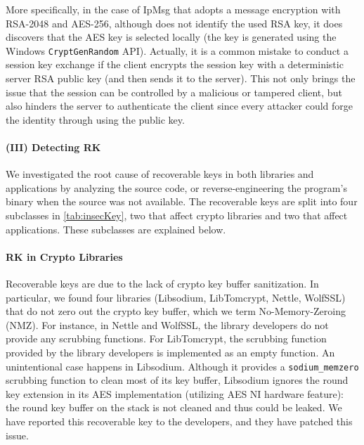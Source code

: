 {
More specifically, in the case of \textsf{\small IpMsg} that adopts a message encryption with \textsf{\small RSA-2048} and \textsf{\small AES-256}, although \sysname does not identify the used RSA key, it does discovers that the AES key is selected locally (the key is generated using the Windows \texttt{CryptGenRandom} API).
Actually, it is a common mistake to conduct a session key exchange if the client encrypts the session key with a deterministic server RSA public key (and then sends it to the server). 
This not only brings the issue that the session can be controlled by a malicious or tampered client, but also hinders the server to authenticate the client since every attacker could forge the identity through using the public key.
}

\paragraph{\bf{(III) Detecting RK}}\label{sec:eval:residue}
We investigated the root cause of recoverable keys in both libraries and applications  
by analyzing the source code, or reverse-engineering the program's binary  when the source was not available.
The recoverable keys are split into four subclasses in \autoref{tab:insecKey}, two that affect crypto libraries and two that affect applications. These subclasses are explained below.  

\paragraph{RK in Crypto Libraries}
Recoverable keys are due to the lack of crypto key buffer sanitization. In particular, we found four libraries (\textsf{\small Libsodium}, \textsf{\small LibTomcrypt}, \textsf{\small Nettle}, \textsf{\small WolfSSL}) that do not zero out the crypto key buffer, which we term No-Memory-Zeroing (NMZ). For instance, in \textsf{\small Nettle} and \textsf{\small WolfSSL}, the library developers do not provide any scrubbing functions.
For \textsf{\small LibTomcrypt}, the scrubbing function provided by the library developers is implemented as an empty function.
An unintentional case happens in \textsf{\small Libsodium}. 
Although it provides a \texttt{sodium\_memzero} scrubbing function to clean most of its key buffer, \textsf{\small Libsodium} ignores the round key extension in its \textsf{\small AES} implementation (utilizing \textsf{\small AES NI} hardware feature): the round key buffer on the stack is not cleaned and thus could be leaked. 
We have reported this recoverable key to the developers, and they have patched this issue.

